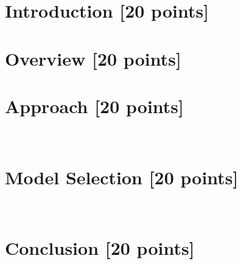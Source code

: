 \newif\ifshowsolutions
\showsolutionstrue







\pagestyle{fancy}




\newpage

\section{Introduction [20 points]}
\newpage

\section{Overview [20 points]}
\newpage

\section{Approach [20 points]}
\newpage~
\newpage

\section{Model Selection [20 points]}
\newpage~
\newpage

\newpage
\section{Conclusion [20 points]}
\newpage~
\newpage



